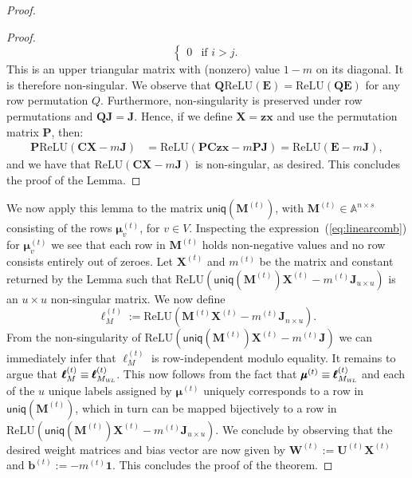 \begin{proof}
\begin{proof}
$$\begin{cases}
0  & \text{if $i>j$}.
\end{cases}
$$
This is an upper triangular matrix with (nonzero) value $1-m$ on its diagonal. It is therefore non-singular. 
We observe that $\mathbf{Q}\text{ReLU}(\mathbf{E})=\text{ReLU}(\mathbf{Q}\mathbf{E})$ for any row permutation $Q$. Furthermore, non-singularity is preserved under row permutations and $\mathbf{Q}\mathbf{J}=\mathbf{J}$. Hence, if we define $\mathbf{X}=\mathbf{z}\mathbf{x}$ and use the permutation matrix $\mathbf{P}$, then:
\begin{align*}
\mathbf{P}\text{ReLU}(\mathbf{C}\mathbf{X}-m\mathbf{J})&=
\text{ReLU}(\mathbf{P}\mathbf{C}\mathbf{z}\mathbf{x}-m\mathbf{P}\mathbf{J})=\text{ReLU}(\mathbf{E}-m\mathbf{J}),
\end{align*}
and we have that $\text{ReLU}(\mathbf{C}\mathbf{X}-m\mathbf{J})$ is non-singular, as desired. This concludes the proof of the Lemma.
\end{proof}

We now apply this lemma to the matrix $\mathsf{uniq}(\mathbf{M}^{(t)})$, with $\mathbf{M}^{(t)}\in\mathbb{A}^{n\times s}$ consisting of the rows $\pmb{\mu}^{(t)}_v$, for $v\in V$. Inspecting the expression~(\ref{eq:linearcomb}) for $\pmb{\mu}^{(t)}_v$ we see that each row in $\mathbf{M}^{(t)}$ holds non-negative values and no row consists entirely out of zeroes. Let $\mathbf{X}^{(t)}$ and $m^{(t)}$ be the matrix and constant 
returned by the Lemma such that $\text{ReLU}\left(\mathsf{uniq}(\mathbf{M}^{(t)})\mathbf{X}^{(t)}-m^{(t)}\mathbf{J}_{u\times u}\right)$ is an $u\times u$ non-singular matrix. We now define
$$
\pmb{\ell}_M^{(t)}:=\text{ReLU}\left(\mathbf{M}^{(t)}\mathbf{X}^{(t)}-m^{(t)}\mathbf{J}_{n\times u}\right).$$
From the non-singularity of $\text{ReLU}\left(\mathsf{uniq}(\mathbf{M}^{(t)})\mathbf{X}^{(t)}-m^{(t)}\mathbf{J}\right)$ we can immediately infer that $\pmb{\ell}_M^{(t)}$ is row-independent modulo equality. It remains to argue that 
$\pmb{\ell}_M^{(t)}\equiv\pmb{\ell}_{M_{\textsl{WL}}}^{(t)}$. This now follows from the fact that $\pmb{\mu}^{(t)}\equiv \pmb{\ell}_{M_{\textsl{WL}}}^{(t)}$
and each of the $u$ unique labels assigned by $\pmb{\mu}^{(t)}$ uniquely corresponds to a row in $\mathsf{uniq}(\mathbf{M}^{(t)})$, which in turn can be mapped bijectively to a row in $\text{ReLU}\left(\mathsf{uniq}(\mathbf{M}^{(t)})\mathbf{X}^{(t)}-m^{(t)}\mathbf{J}_{u\times u} \right)$. We conclude by observing that the desired weight matrices and bias vector are now given by
$\mathbf{W}^{(t)}:=\mathbf{U}^{(t)}\mathbf{X}^{(t)}$ 
and $\mathbf{b}^{(t)}:=-m^{(t)}\mathbf{1}$. This concludes the proof of the theorem.\end{proof}

